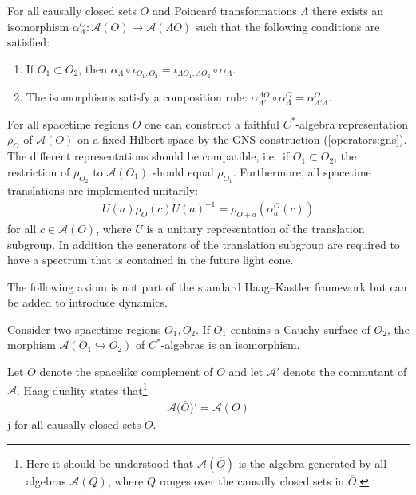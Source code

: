     \begin{axiom}
        For all causally closed sets $O$ and Poincar\'e transformations $\Lambda$ there exists an isomorphism $\alpha^O_\Lambda:\mathcal{A}(O)\rightarrow\mathcal{A}(\Lambda O)$ such that the following conditions are satisfied:
        \begin{enumerate}
            \item If $O_1\subset O_2$, then $\alpha_\Lambda\circ\iota_{O_1,O_2} = \iota_{\Lambda O_1,\Lambda O_2}\circ\alpha_\Lambda$.
            \item The isomorphisms satisfy a composition rule: $\alpha^{\Lambda O}_{\Lambda'}\circ\alpha^O_\Lambda = \alpha^O_{\Lambda'\Lambda}$.
        \end{enumerate}
    \end{axiom}

    \begin{axiom}[Spectrum]
        For all spacetime regions $O$ one can construct a faithful $C^*$-algebra representation $\rho_O$ of $\mathcal{A}(O)$ on a fixed Hilbert space by the GNS construction (\cref{operators:gns}). The different representations should be compatible, i.e.~if $O_1\subset O_2$, the restriction of $\rho_{O_2}$ to $\mathcal{A}(O_1)$ should equal $\rho_{O_1}$. Furthermore, all spacetime translations are implemented unitarily:
        \begin{gather}
            U(a)\rho_O(c)U(a)^{-1} = \rho_{O+a}\left(\alpha^O_a(c)\right)
        \end{gather}
        for all $c\in\mathcal{A}(O)$, where $U$ is a unitary representation of the translation subgroup. In addition the generators of the translation subgroup are required to have a spectrum that is contained in the future light cone.
    \end{axiom}

    The following axiom is not part of the standard Haag--Kastler framework but can be added to introduce dynamics.
    \begin{axiom}
        Consider two spacetime regions $O_1,O_2$. If $O_1$ contains a Cauchy surface of $O_2$, the morphism $\mathcal{A}(O_1\hookrightarrow O_2)$ of $C^*$-algebras is an isomorphism.
    \end{axiom}

    \begin{axiom}
        Let $\overline{O}$ denote the spacelike complement of $O$ and let $\mathcal{A}'$ denote the commutant of $\mathcal{A}$. Haag duality states that\footnote{Here it should be understood that $\mathcal{A}\left(\overline{O}\right)$ is the algebra generated by all algebras $\mathcal{A}(Q)$, where $Q$ ranges over the causally closed sets in $\overline{O}$.}
        \begin{gather}
            \mathcal{A}\bigl(\overline{O}\bigr)' = \mathcal{A}(O)
        \end{gather}j
        for all causally closed sets $O$.
    \end{axiom}

